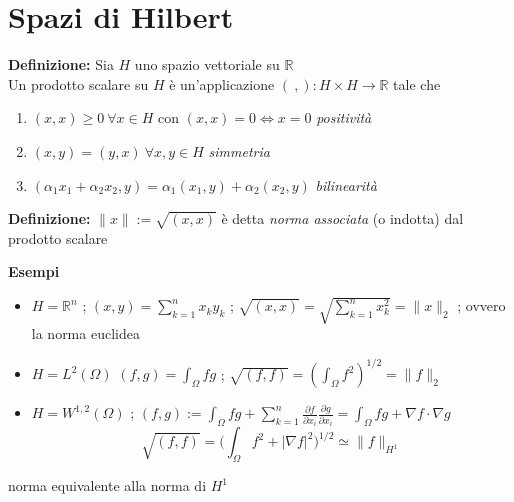 \documentclass[a4paper]{article}
\newcommand{\R}{\mathbb{R}}
\begin{document}
\section{Spazi di Hilbert}
\begin{tcolorbox}
\textbf{Definizione: }Sia $H$ uno spazio vettoriale su $\R$ 
\\Un prodotto scalare su $H$ è un'applicazione $(\ ,):H\times H\to \R$ tale che
\begin{enumerate}
	\item $(x,x)\ge 0\ \forall x\in H$ con $(x,x)=0\iff x=0$ \emph{positività} 
	\item $(x,y)=(y,x)\ \forall x,y\in H$ \emph{simmetria}
	\item $(\alpha_1x_1+\alpha_2x_2,y)=\alpha_1(x_1,y)+\alpha_2(x_2,y)$ \emph{bilinearità}
\end{enumerate}
\end{tcolorbox}
\begin{tcolorbox}
	\textbf{Definizione: }$\|x\|:=\sqrt{(x,x)} $ è detta \emph{norma associata} (o indotta) dal prodotto scalare

\end{tcolorbox}
\textbf{Esempi} 
\begin{itemize}
	\item $H=\R^n$ ;   $(x,y)=\sum_{k=1}^{n} x_ky_k$ ;   $\sqrt{ (x,x)}=\sqrt{\sum_{k=1}^{n} x_k^2}=\|x\|_2 $ ; ovvero la norma euclidea
	\item $H=L^{2}(\Omega)$   $(f,g)=\int_{\Omega}^{} fg $ ; $\sqrt{(f,f)} =(\int_{\Omega}^{} f^2)^{1 / 2}=\|f\|_2 $ 
	\item $H=W^{1,2}(\Omega)$ ; $(f,g):=\int_{\Omega}^{} fg+\sum_{k=1}^{n} \frac{\partial f}{\partial x_i} \frac{\partial g}{\partial x_i} =\int_{\Omega}^{}fg+\nabla f\cdot \nabla g   $       
		\[\sqrt{(f,f)}=\bigg(\int_{\Omega}^{} f^2+|\nabla f|^2\bigg)^{1 / 2}\simeq\|f\|_{H^1} \]
\end{itemize}
norma equivalente alla norma di $H^1$ 
\end{document}
